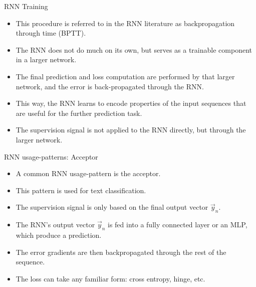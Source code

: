 \documentclass[handout]{beamer}
\begin{document}
\begin{frame}{RNN Training}
\begin{scriptsize}
\begin{itemize}
\item This procedure is referred to in the RNN literature as backpropagation through time (BPTT).
\item The RNN does not do much on its own, but serves as a trainable component in a larger network.
\item The final prediction and loss computation are performed by that larger network, and the error is back-propagated through the RNN.
\item This way, the RNN learns to encode properties of the input sequences that are
useful for the further prediction task.
\item The supervision signal is not applied to the RNN directly, but through the larger network.
\end{itemize}
\end{scriptsize}
\end{frame}



\begin{frame}{RNN usage-patterns: Acceptor}
\begin{scriptsize}
\begin{itemize}
\item A common RNN usage-pattern is the acceptor.
\item This pattern is used for text classification.
\item The supervision signal is only based on the final output vector $\vec{y}_n$.

\item The RNN's output vector $\vec{y}_n$ is fed into a fully connected layer or an MLP, which produce a prediction.

\item The error gradients are then backpropagated through the
rest of the sequence.
\item The loss can take any familiar form: cross entropy, hinge, etc.


\end{itemize}
\end{scriptsize}
\end{frame}
\end{document}
